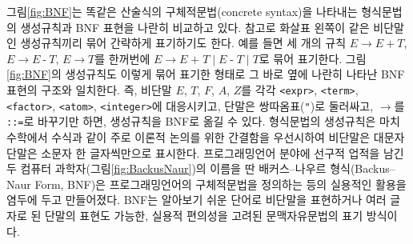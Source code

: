 그림\;\ref{fig:BNF}는 똑같은 산술식의 구체적문법(concrete syntax)을
나타내는 형식문법의 생성규칙과 BNF 표현을 나란히 비교하고 있다.
참고로 화살표 왼쪽이 같은 비단말인 생성규칙끼리 묶어 간략하게 표기하기도 한다.
예를 들면 세 개의 규칙
$E \to E ~\texttt{+}~ T$, $E \to E ~\texttt{-}~ T$, $E \to T$를
한꺼번에 $E \to E\;\texttt{+}\;T \mid E\;\texttt{-}\;T \mid T$로
묶어 표기한다. 그림\;\ref{fig:BNF}의 생성규칙도 이렇게 묶어 표기한 형태로
그 바로 옆에 나란히 나타난 BNF 표현의 구조와 일치한다.
즉, 비단말 $E$, $T$, $F$, $A$, $Z$를 각각 \texttt{<expr>},
\texttt{<term>}, \texttt{<factor>}, \texttt{<atom>}, \texttt{<integer>}에 대응시키고, 단말은
쌍따옴표(\texttt{"})로 둘러싸고, $\to$를 \texttt{::=}로
바꾸기만 하면, 생성규칙을 BNF로 옮길 수 있다. 형식문법의 생성규칙은
마치 수학에서 수식과 같이 주로 이론적 논의를 위한 간결함을 우선시하여
비단말은 대문자 단말은 소문자 한 글자씩만으로 표시한다.
프로그래밍언어 분야에 선구적 업적을 남긴
두 컴퓨터 과학자(그림\;\ref{fig:BackusNaur})의 이름을 딴
배커스--나우르 형식(Backus--Naur Form, BNF)은 프로그래밍언어의
구체적문법을 정의하는 등의 실용적인 활용을 염두에 두고 만들어졌다.
BNF는 알아보기 쉬운 단어로 비단말을 표현하거나 여러 글자로 된 단말의
표현도 가능한, 실용적 편의성을 고려된 문맥자유문법의 표기 방식이다.

